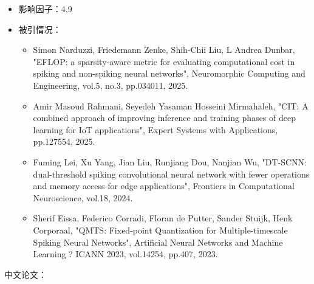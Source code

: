 \begin{itemize}
    \item 影响因子：4.9
    \item 被引情况：
        \begin{itemize}
            \item  Simon Narduzzi, Friedemann Zenke, Shih-Chii Liu, L Andrea Dunbar, "EFLOP: a sparsity-aware metric for evaluating computational cost in spiking and non-spiking neural networks", Neuromorphic Computing and Engineering, vol.5, no.3, pp.034011, 2025.
            \item  Amir Masoud Rahmani, Seyedeh Yasaman Hosseini Mirmahaleh, "CIT: A combined approach of improving inference and training phases of deep learning for IoT applications", Expert Systems with Applications, pp.127554, 2025.
            \item  Fuming Lei, Xu Yang, Jian Liu, Runjiang Dou, Nanjian Wu, "DT-SCNN: dual-threshold spiking convolutional neural network with fewer operations and memory access for edge applications", Frontiers in Computational Neuroscience, vol.18, 2024.
            \item  Sherif Eissa, Federico Corradi, Floran de Putter, Sander Stuijk, Henk Corporaal, "QMTS: Fixed-point Quantization for Multiple-timescale Spiking Neural Networks", Artificial Neural Networks and Machine Learning ? ICANN 2023, vol.14254, pp.407, 2023.
        \end{itemize}
\end{itemize}

中文论文：

